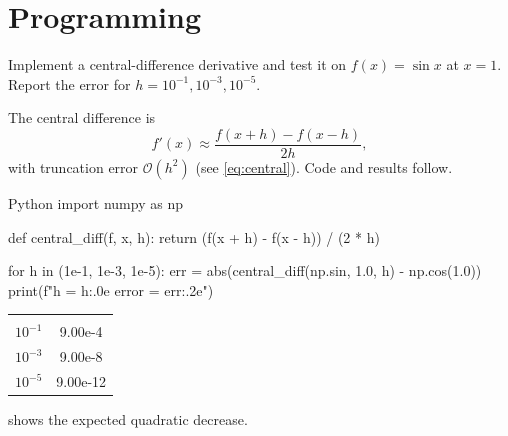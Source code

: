 \section{Programming}

\begin{problem}
Implement a central-difference derivative and test it on $f(x)=\sin x$ at $x=1$.
Report the error for $h=10^{-1},10^{-3},10^{-5}$.
\end{problem}

\begin{solution}
The central difference is
\begin{equation}\label{eq:central}
  f'(x)\approx\frac{f(x+h)-f(x-h)}{2h},
\end{equation}
with truncation error $\mathcal{O}(h^2)$ (see \cref{eq:central}). Code and results follow.

\begin{codebox}[title=derivative.py]{Python}
import numpy as np

def central_diff(f, x, h):
    return (f(x + h) - f(x - h)) / (2 * h)

for h in (1e-1, 1e-3, 1e-5):
    err = abs(central_diff(np.sin, 1.0, h) - np.cos(1.0))
    print(f"h = {h:.0e}   error = {err:.2e}")
\end{codebox}

\begin{center}\atlrows
  \label{tab:err}
  \begin{tabular}{@{}lS[table-format=1.2e-2]@{}}
     & {}\\
    $10^{-1}$ & 9.00e-4 \\
    $10^{-3}$ & 9.00e-8 \\
    $10^{-5}$ & 9.00e-12 \\
  \end{tabular}
\end{center}

 shows the expected quadratic decrease.
\end{solution}

